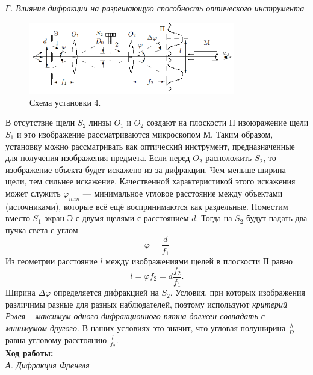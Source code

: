 \documentclass[a4paper, 12pt]{article}%
\begin{document}
	 
	 \textit{Г. Влияние дифракции на разрешающую способность оптического инструмента}\\
	 
	 
	 \begin{figure}[h]
	 	\includegraphics[width = 0.8\textwidth]{5.png}
	 	\centering
	 	\caption{Схема установки 4.}
	 \end{figure}
	 В отсутствие щели $S_2$ линзы $O_1$ и $O_2$ создают на плоскости П изоюражение щели $S_1$ и это изображение рассматриваются микроскопом М. Таким образом, установку можно рассматривать как оптический инструмент, предназначенные для получения изображения предмета. Если перед $O_2$ расположить $S_2$, то изображение объекта будет искажено из-за дифракции. Чем меньше ширина щели, тем сильнее искажение. Качественной характеристикой этого искажения может служить $\varphi_{min}$ --- минимальное угловое расстояние между объектами (источниками), которые всё ещё воспринимаются как раздельные. Поместим вместо $S_1$ экран Э с двумя щелями с расстоянием $d$. Тогда на $S_2$ будут падать два пучка света с углом
	 \begin{equation}
	 	\varphi = \dfrac{d}{f_1}
	 \end{equation}
	 Из геометрии расстояние $l$ между изображениями щелей в плоскости П равно 
	 \begin{equation}
	 	l = \varphi f_2 = d \dfrac{f_2}{f_1}.
	 \end{equation}
	 Ширина $\Delta \varphi$ определяется дифракцией на $S_2$. Условия, при которых изображения различимы разные для разных наблюдателей, поэтому используют \textit{критерий Рэлея} -- \textit{максимум одного дифракционного пятна должен совпадать с минимумом другого}. В наших условиях это значит, что угловая полуширина $\frac{\lambda}{D}$ равна угловому расстоянию $\frac{l}{f_2}$.\\
	 
	 
	 \textbf{Ход работы: }\\
	 
	 \textit{А. Дифракция Френеля}\\
	
\end{document}
